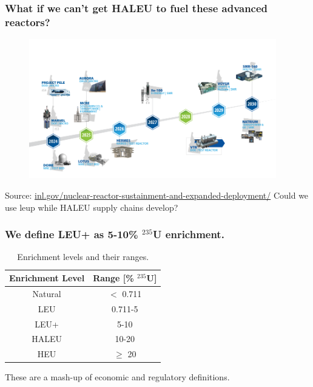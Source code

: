 \documentclass[9pt]{beamer}
\begin{document}
  \begin{frame}
    \frametitle{What if we can't get HALEU to fuel these advanced reactors?}
    \vspace{-25pt}
    \begin{figure}
        \centering
        \includegraphics[width=0.96\textwidth]{images/reactor_timeline.png}
    \end{figure}
    Source: \url{inl.gov/nuclear-reactor-sustainment-and-expanded-deployment/}
    \vspace{-8pt}
    Could we use \gls{leup} while HALEU supply chains develop?
  \end{frame}

  \begin{frame}
    \frametitle{We define LEU+ as 5-10\% $^{235}$U enrichment.}
    \begin{table}[H]
        \centering
        \caption{Enrichment levels and their ranges.}
        \label{tab:enrichment_levels}
        \begin{tabular}{c c}
          \hline
          \textbf{Enrichment Level} & \textbf{Range [\%  $^{235}$U]} \\
          \hline
          Natural & $<$ 0.711 \\
          LEU & 0.711-5 \\
          LEU+ & 5-10 \\
          HALEU & 10-20 \\
          HEU & $\geq$ 20  \\
          \hline
        \end{tabular}
    \end{table}
    These are a mash-up of economic and regulatory definitions.
  \end{frame}
\end{document}

